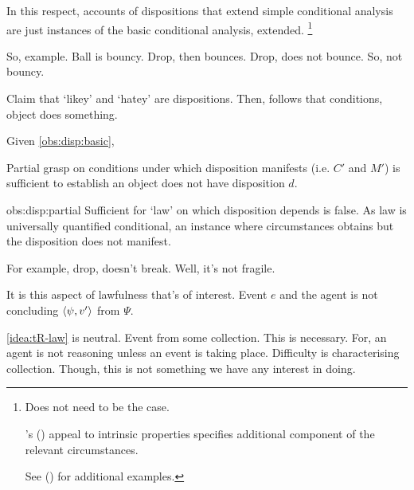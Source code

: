 \begin{note}
  In this respect, accounts of dispositions that extend simple conditional analysis are just instances of the basic conditional analysis, extended.%
  \footnote{
    Does not need to be the case.

    \citeauthor{Lewis:1997wg}'s (\citeyear{Lewis:1997wg}) appeal to intrinsic properties specifies additional component of the relevant circumstances.

    See (\cite[\S1.4]{Choi:2021wg}) for additional examples.
  }
\end{note}


\begin{note}
  So, example.
  Ball is bouncy.
  Drop, then bounces.
  Drop, does not bounce.
  So, not bouncy.

  Claim that `likey' and `hatey' are dispositions.
  Then, follows that conditions, object does something.
\end{note}

\begin{note}
  \begin{observation}
    \label{obs:disp:partial}
    Given \autoref{obs:disp:basic},

    Partial grasp on conditions under which disposition manifests (i.e. \(C'\) and \(M'\)) is sufficient to establish an object does not have disposition \(d\).
  \end{observation}

  \begin{motivation}{obs:disp:partial}
    Sufficient for `law' on which disposition depends is false.
    As law is universally quantified conditional, an instance where circumstances obtains but the disposition does not manifest.
  \end{motivation}

  For example, drop, doesn't break.
  Well, it's not fragile.

  It is this aspect of lawfulness that's of interest.
  Event \(e\) and the agent is not concluding \(\langle \psi, v' \rangle\) from \(\Psi\).

  \autoref{idea:tR-law} is neutral.
  Event from some collection.
  This is necessary.
  For, an agent is not reasoning unless an event is taking place.
  Difficulty is characterising collection.
  Though, this is not something we have any interest in doing.
\end{note}

